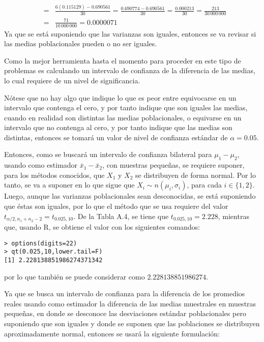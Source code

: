 \begin{solucion}
\begin{eqnarray*}
  & = & \frac{6(0.115129) - 0.690561}{30} = \frac{0.690774 - 0.690561}{30} = \frac{0.000213}{30} = \frac{213}{30\,000\,000} \\
  & = & \frac{71}{10\,000\,000} = 0.0000071
 \end{eqnarray*}
 Ya que se est\'a suponiendo que las varianzas son iguales, entonces se va revisar si las medias poblacionales pueden o no ser iguales.
 \par 
 Como la mejor herramienta hasta el momento para proceder en este tipo de problemas es calculando un intervalo de confianza de la diferencia de las medias, lo cual requiere de un nivel de significancia.
 \par
 N\'otese que no hay algo que indique lo que es peor entre equivocarse en un intervalo que contenga el cero, y por tanto indique que son iguales las medias, cuando en realidad son distintas las medias poblacionales, o equivarse en un intervalo que no contenga al cero, y por tanto indique que las medias son distintas, entonces se tomar\'a un valor de nivel de confianza est\'andar de $\alpha = 0.05$.
 \par 
 Entonces, como se buscar\'a un intervalo de confianza bilateral para $\mu_1 - \mu_2$, usando como estimador $\bar{x}_1 - \bar{x}_2$, con muestras peque\~nas, se requiere suponer, para los m\'etodos conocidos, que $X_1$ y $X_2$ se distribuyen de forma normal. Por lo tanto, se va a suponer en lo que sigue que $X_i \sim n\left( \mu_i, \sigma_i \right)$, para cada $i \in \{ 1, 2 \}$. Luego, aunque las varianzas poblacionales sean desconocidas, se est\'a suponiendo que \'estas son iguales, por lo que el m\'etodo que se usa requiere del valor $t_{\alpha/2,n_1+n_2-2} = t_{0.025,10}$. De la Tabla A.4, se tiene que $t_{0.025,10} = 2.228$, mientras que, usando R, se obtiene el valor con los siguientes comandos:
 \begin{verbatim}
> options(digits=22)
> qt(0.025,10,lower.tail=F)
[1] 2.228138851986274371342
 \end{verbatim}
 \vspace{-0.5cm}
 por lo que tambi\'en se puede considerar como $2.228138851986274$.
 \par 
 Ya que se busca un intervalo de confianza para la diferencia de los promedios reales usando como estimador la diferencia de las medias muestrales en muestras peque\~nas, en donde se desconoce las desviaciones est\'andar poblacionales pero suponiendo que son iguales y donde se suponen que las poblaciones se distribuyen aproximadamente normal, entonces se usar\'a la siguiente formulaci\'on:

\end{solucion}
